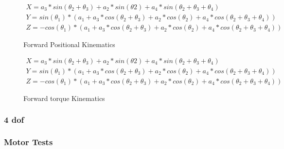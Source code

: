     \begin{figure}[H]
    \centering
    \begin{gather*}
    X = a_3*sin(\theta_2+\theta_3)+a_2*sin(\theta2)+a_4*sin(\theta_2+\theta_3+\theta_4)\\
    Y = sin(\theta_1)*(a_1+a_3*cos(\theta_2+\theta_3)+a_2*cos(\theta_2)+a_4*cos(\theta_2+\theta_3+\theta_4))\\
    Z = -cos(\theta_1)*(a_1+a_3*cos(\theta_2+\theta_3)+a_2*cos(\theta_2)+a_4*cos(\theta_2+\theta_3+\theta_4))
    \end{gather*}
    
    \caption{Forward Positional Kinematics}
    \label{fig:my_label}
    \end{figure}
    
    \begin{figure}[H]
    \centering
    \begin{gather*}
    X = a_3*sin(\theta_2+\theta_3)+a_2*sin(\theta2)+a_4*sin(\theta_2+\theta_3+\theta_4)\\
    Y = sin(\theta_1)*(a_1+a_3*cos(\theta_2+\theta_3)+a_2*cos(\theta_2)+a_4*cos(\theta_2+\theta_3+\theta_4))\\
    Z = -cos(\theta_1)*(a_1+a_3*cos(\theta_2+\theta_3)+a_2*cos(\theta_2)+a_4*cos(\theta_2+\theta_3+\theta_4))
    \end{gather*}
    
    \caption{Forward torque Kinematics}
    \label{fig:my_label}
    \end{figure}

     \subsubsection{4 dof}
     \subsubsection{Motor Tests}